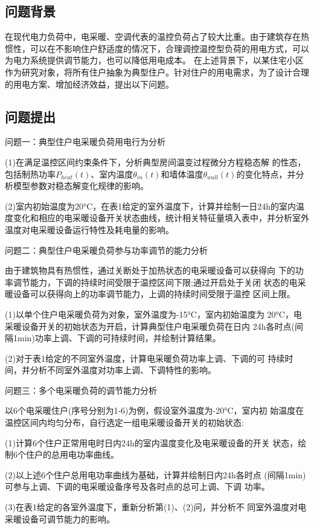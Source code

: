 \documentclass[withoutpreface,bwprint]{cumcmthesis} %
\begin{document}
\subsection{问题背景}
在现代电力负荷中，电采暖、空调代表的温控负荷占了较大比重。由于建筑存在热惯性，可以在不影响住户舒适度的情况下，合理调控温控型负荷的用电方式，可以为电力系统提供调节能力，也可以降低用电成本。
在上述背景下，以某住宅小区作为研究对象，将所有住户抽象为典型住户。针对住户的用电需求，为了设计合理的用电方案、增加经济效益，提出以下问题。
\subsection{问题提出}
问题一：典型住户电采暖负荷用电行为分析 

(1)在满足温控区间约束条件下，分析典型房间温变过程微分方程稳态解
的性态，包括制热功率$P_{heat}(t)$、室内温度$\theta_{in}(t)$和墙体温度$\theta_{wall}(t)$的变化特点，并分析模型参数对稳态解变化规律的影响。 

(2)室内初始温度为20°C，在表1给定的室外温度下，计算并绘制一日24h的室内温度变化和相应的电采暖设备开关状态曲线，统计相关特征量填入表中，并分析室外温度对电采暖设备运行特性及耗电量的影响。

问题二：典型住户电采暖负荷参与功率调节的能力分析

由于建筑物具有热惯性，通过关断处于加热状态的电采暖设备可以获得向 下的功率调节能力，下调的持续时间受限于温控区间下限;通过开启处于关闭 状态的电采暖设备可以获得向上的功率调节能力，上调的持续时间受限于温控 区间上限。

(1)以单个住户电采暖负荷为对象，室外温度为-15°C，室内初始温度为 20°C，电采暖设备开关的初始状态为开启，计算典型住户电采暖负荷在日内 24h各时点(间隔1min)功率上调、下调的可持续时间，并绘制计算结果。

(2)对于表1给定的不同室外温度，计算电采暖负荷功率上调、下调的可 持续时间，并分析不同室外温度对功率上调、下调特性的影响。

问题三：多个电采暖负荷的调节能力分析

以6个电采暖住户(序号分别为1-6)为例，假设室外温度为-20°C，室内初 始温度在温控区间内均匀分布，自行选定一组电采暖设备开关的初始状态:

(1)计算6个住户正常用电时日内24h的室内温度变化及电采暖设备的开关 状态，绘制6个住户的总用电功率曲线。

(2)以上述6个住户总用电功率曲线为基础，计算并绘制日内24h各时点 (间隔1min)可参与上调、下调的电采暖设备序号及各时点的总可上调、下调 功率。

(3)在表1给定的各室外温度下，重新分析第(1)、(2)问，并分析不 同室外温度对电采暖设备可调节能力的影响。
\end{document}
